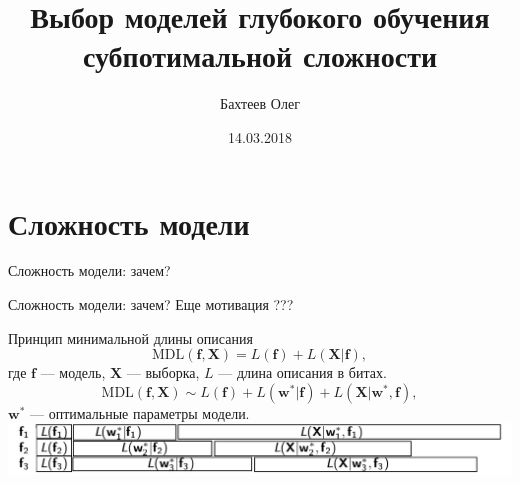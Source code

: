 \documentclass[10pt,pdf,utf8,russian,aspectratio=169]{beamer}
\title[Выбор моделей]{Выбор моделей глубокого обучения субпотимальной сложности}
\author{Бахтеев Олег}
\institute{МФТИ}
\date{14.03.2018}
\begin{document}
\begin{frame}
  \titlepage
\end{frame}


\section{Сложность модели}
\begin{frame}{Сложность модели: зачем?}
\begin{figure}
  \centering
\label{fig:1}\qquad

\end{figure}


\end{frame}

\begin{frame}{Сложность модели: зачем?}
 Еще мотивация ???
\end{frame}


\begin{frame}{Принцип минимальной длины описания}
\[
\text{MDL}(\mathbf{f}, \mathbf{X}) = L(\mathbf{f}) + L(\mathbf{X}|\mathbf{f}),
\]
где $\mathbf{f}$ --- модель, $\mathbf{X}$ --- выборка, $L$ --- длина описания в битах.
\\
\[
\text{MDL}(\mathbf{f}, \mathbf{X}) \sim L(\mathbf{f}) + L(\mathbf{w}^*| \mathbf{f}) + L(\mathbf{X}|\mathbf{w}^*, \mathbf{f}),
\]
$\mathbf{w}^*$ --- оптимальные параметры модели.\\

\includegraphics[width=\textwidth]{./mdl.png}

\end{frame}
\end{document}
